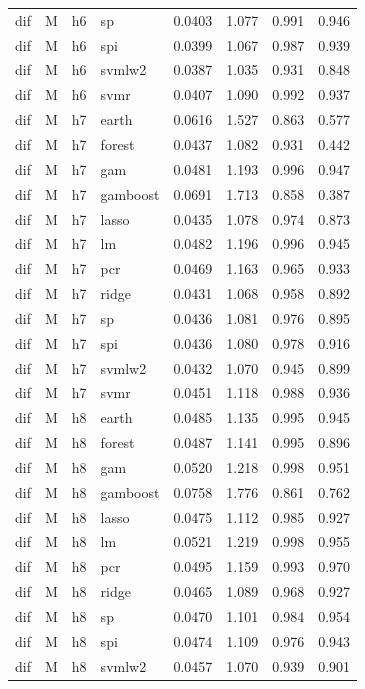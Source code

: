 \begin{ThreePartTable}
\begin{longtable}[t]{llclcccc}
dif & M & h6 & sp & 0.0403 & 1.077 & 0.991 & 0.946\\
dif & M & h6 & spi & 0.0399 & 1.067 & 0.987 & 0.939\\
dif & M & h6 & svmlw2 & 0.0387 & 1.035 & 0.931 & 0.848\\
dif & M & h6 & svmr & 0.0407 & 1.090 & 0.992 & 0.937\\
\addlinespace
dif & M & h7 & earth & 0.0616 & 1.527 & 0.863 & 0.577\\
dif & M & h7 & forest & 0.0437 & 1.082 & 0.931 & 0.442\\
dif & M & h7 & gam & 0.0481 & 1.193 & 0.996 & 0.947\\
dif & M & h7 & gamboost & 0.0691 & 1.713 & 0.858 & 0.387\\
dif & M & h7 & lasso & 0.0435 & 1.078 & 0.974 & 0.873\\
dif & M & h7 & lm & 0.0482 & 1.196 & 0.996 & 0.945\\
dif & M & h7 & pcr & 0.0469 & 1.163 & 0.965 & 0.933\\
dif & M & h7 & ridge & 0.0431 & 1.068 & 0.958 & 0.892\\
dif & M & h7 & sp & 0.0436 & 1.081 & 0.976 & 0.895\\
dif & M & h7 & spi & 0.0436 & 1.080 & 0.978 & 0.916\\
dif & M & h7 & svmlw2 & 0.0432 & 1.070 & 0.945 & 0.899\\
dif & M & h7 & svmr & 0.0451 & 1.118 & 0.988 & 0.936\\
\addlinespace
dif & M & h8 & earth & 0.0485 & 1.135 & 0.995 & 0.945\\
dif & M & h8 & forest & 0.0487 & 1.141 & 0.995 & 0.896\\
dif & M & h8 & gam & 0.0520 & 1.218 & 0.998 & 0.951\\
dif & M & h8 & gamboost & 0.0758 & 1.776 & 0.861 & 0.762\\
dif & M & h8 & lasso & 0.0475 & 1.112 & 0.985 & 0.927\\
dif & M & h8 & lm & 0.0521 & 1.219 & 0.998 & 0.955\\
dif & M & h8 & pcr & 0.0495 & 1.159 & 0.993 & 0.970\\
dif & M & h8 & ridge & 0.0465 & 1.089 & 0.968 & 0.927\\
dif & M & h8 & sp & 0.0470 & 1.101 & 0.984 & 0.954\\
dif & M & h8 & spi & 0.0474 & 1.109 & 0.976 & 0.943\\
dif & M & h8 & svmlw2 & 0.0457 & 1.070 & 0.939 & 0.901\\

\end{longtable}
\end{ThreePartTable}
